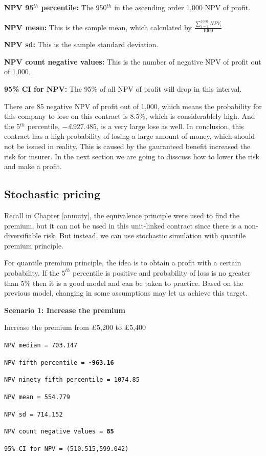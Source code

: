 \documentclass{report}
\begin{document}
\textbf{NPV 95$^{th}$ percentile:} The 950$^{th}$ in the ascending order 1,000 NPV of profit.

\textbf{NPV mean:} This is the sample mean, which calculated by $\frac{\sum_{i=1}^{1000} NPV_i}{1000}$

\textbf{NPV sd:} This is the sample standard deviation. 

\textbf{NPV count negative values:} This is the number of negative NPV of profit out of 1,000.

\textbf{95\% CI for NPV:} The 95\% of all NPV of profit will drop in this interval.


There are 85 negative NPV of profit out of 1,000, which means the probability for this company to lose on this contract is 8.5\%, which is considerablely high. And the 5$^{th}$ percentile, ${-\pounds927.485}$, is a very large lose as well. In conclusion, this contract has a high probability of losing a large amount of money, which should not be issued in reality. This is caused by the gauranteed benefit increased the risk for insurer. In the next section we are going to disscuss how to lower the risk and make a profit.


\subsection{Stochastic pricing}

Recall in Chapter \ref{annuity}, the equivalence principle were used to find the premium, but it can not be used in this unit-linked contract since there is a non-diversifiable risk. But instead, we can use stochastic simulation with quantile premium principle\cite{bib:quantile-premium}. 

For quantile premium principle, the idea is to obtain a profit with a certain probability. If the $5^{th}$ percentile is positive and probability of loss is no greater than 5\% then it is a good model and can be taken to practice. Based on the previous model, changing in some assumptions may let us achieve this target. 

\textbf{Scenario 1: Increase the premium}

Increase the premium from \pounds5,200 to \pounds5,400

\texttt{NPV median = 703.147}

{\renewcommand\baselinestretch{1}\selectfont

\texttt{NPV fifth percentile = \textbf{-963.16}}

\texttt{NPV ninety fifth percentile = 1074.85}

\texttt{NPV mean = 554.779}

\texttt{NPV sd = 714.152}

\texttt{NPV count negative values = \textbf{85}}

\texttt{95\% CI for NPV = (510.515,599.042)}

\par}
\end{document}
